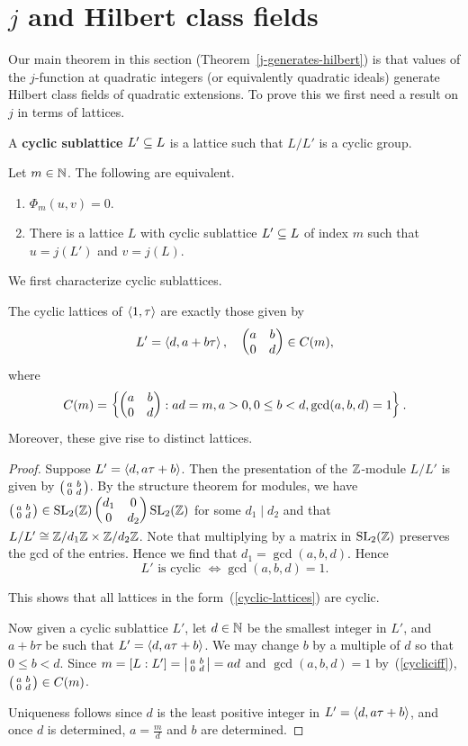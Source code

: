 \section{$j$ and Hilbert class fields}
Our main theorem in this section (Theorem~\ref{j-generates-hilbert}) is that values of the $j$-function at quadratic integers (or equivalently quadratic ideals) generate Hilbert class fields of quadratic extensions. To prove this we first need a result on $j$ in terms of lattices.
\begin{df}
A \textbf{cyclic sublattice} $L'\subseteq L$ is a lattice such that $L/L'$ is a cyclic group.
\end{df}
\begin{thm}\label{cyclic-roots-phi}
Let $m\in \mathbb{N}$. The following are equivalent.
\begin{enumerate}
\item $\Phi_m(u,v)=0$.
\item There is a lattice $L$ with cyclic sublattice $L'\subseteq L$ of index $m$ such that $u=j(L')$ and $v=j(L)$.
\end{enumerate}
\end{thm}
We first characterize cyclic sublattices.
\begin{lem}\label{char-cyclic-latt}
The cyclic lattices of $\left\langle {1,\tau}\right\rangle$ are exactly those given by
\begin{equation}\label{cyclic-lattices}
L'=\left\langle {d, a+b\tau}\right\rangle,\quad \begin{pmatrix} {a}&{b}\\ {0}&{d} \end{pmatrix}\in C(m),
\end{equation}
where 
\[
C(m)=\left\{{\begin{pmatrix} {a}&{b}\\ {0}&{d} \end{pmatrix}}:{ad=m, a>0, 0\le b<d, \gcd(a,b,d)=1}\right\}.
\]
Moreover, these give rise to distinct lattices.
\end{lem}
\begin{proof}
Suppose $L'=\left\langle {d,a\tau+b}\right\rangle$. Then the presentation of the $\mathbb{Z}$-module $L/L'$ is  given by $\left(\begin{smallmatrix} {a}&{b}\\ {0}&{d} \end{smallmatrix}\right)$. By the structure theorem for modules, we have $ \left(\begin{smallmatrix} {a}&{b}\\ {0}&{d} \end{smallmatrix}\right) \in \operatorname{SL}_2(\mathbb{Z})\begin{pmatrix} {d_1}&{0}\\ {0}&{d_2} \end{pmatrix}\operatorname{SL}_2(\mathbb{Z})$ for some $d_1\mid d_2$ and that $L/L'\cong \mathbb{Z}/d_1\mathbb{Z}\times \mathbb{Z}/d_2\mathbb{Z}$. Note that multiplying by a matrix in $\operatorname{SL}_2(\mathbb{Z})$ preserves the gcd of the entries. Hence we find that $d_1=\gcd(a,b,d)$. Hence 
\begin{equation}\label{cycliciff}
L'\text{ is cyclic }\iff\gcd(a,b,d)=1.
\end{equation}

This shows that all lattices in the form~(\ref{cyclic-lattices}) are cyclic.

Now given a cyclic sublattice $L'$, let $d\in \mathbb{N}$ be the smallest integer in $L'$, and $a+b\tau$ be such that $L'=\left\langle {d, a\tau+b}\right\rangle$. 
We may change $b$ by a multiple of $d$ so that $0\le b<d$.  Since $m=[L:L']=\left| { \begin{smallmatrix} {a}&{b}\\ {0}&{d} \end{smallmatrix} } \right|=ad$ and $\gcd(a,b,d)=1$ by~(\ref{cycliciff}), $\left(\begin{smallmatrix} {a}&{b}\\ {0}&{d} \end{smallmatrix}\right)\in C(m)$.

Uniqueness follows since $d$ is the least positive integer in $L'=\left\langle {d, a\tau+b}\right\rangle$, and once $d$ is determined, $a=\frac{m}d$ and $b$ are determined.
\end{proof}

